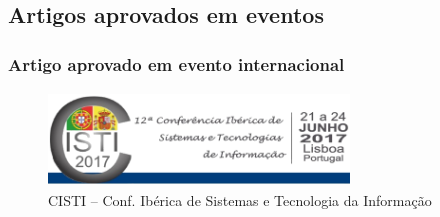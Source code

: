 \documentclass[11pt]{beamer}
\begin{document}
\subsection{Artigos aprovados em eventos} 
\begin{frame}\frametitle{ Artigo aprovado em evento internacional}
	\transboxout[duration=1, direction=25]
	\begin{figure}[ht]
		\centering
		\includegraphics[width=80mm, height=25mm]{Figuras/Extras/Cisti122.png}
		\caption{ CISTI -- Conf. Ibérica de Sistemas e Tecnologia da Informação}
	\end{figure}
\end{frame}
\end{document}
